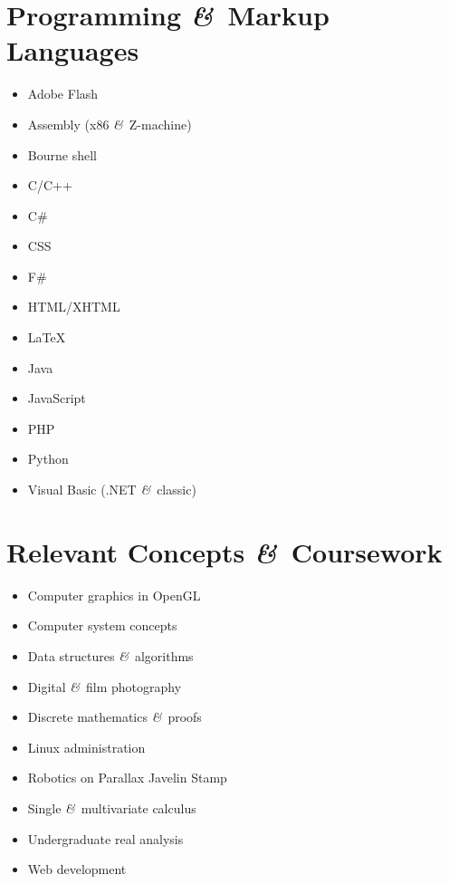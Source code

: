\documentclass[11pt]{simplecv}
\newcommand*\amp{{\fertigopro\itshape\&}}
\begin{document}
  \newpage

  \section{Programming \amp\ Markup Languages}
  \begin{multicols}{2}
    \begin{itemize}
      \item Adobe Flash
      \item Assembly (x86 \amp\ Z-machine)
      \item Bourne shell
      \item C/C++
      \item C\#
      \item CSS
      \item F\#
      \item HTML/XHTML
      \item \LaTeX
      \item Java
      \item JavaScript
      \item PHP
      \item Python
      \item Visual Basic (.NET \amp\ classic)
    \end{itemize}
  \end{multicols}

  \section{Relevant Concepts \amp\ Coursework}
  \begin{multicols}{2}
    \begin{itemize}
      \item Computer graphics in OpenGL
      \item Computer system concepts
      \item Data structures \amp\ algorithms
      \item Digital \amp\ film photography
      \item Discrete mathematics \amp\ proofs
      \item Linux administration
      \item Robotics on Parallax Javelin Stamp
      \item Single \amp\ multivariate calculus
      \item Undergraduate real analysis
      \item Web development
    \end{itemize}
  \end{multicols}
\end{document}
